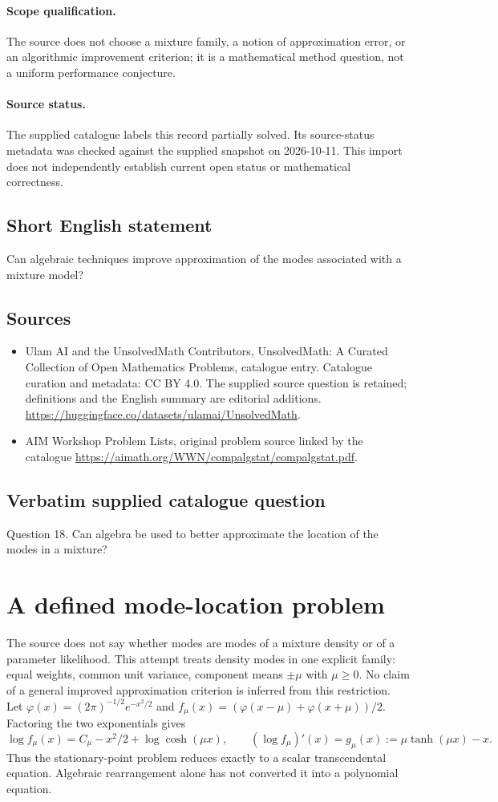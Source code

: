 \documentclass[11pt]{article}
\begin{document}
\paragraph{Scope qualification.}
The source does not choose a mixture family, a notion of approximation error, or an algorithmic improvement criterion; it is a mathematical method question, not a uniform performance conjecture.
\paragraph{Source status.}
The supplied catalogue labels this record partially solved. Its source-status metadata was checked against the supplied snapshot on 2026-10-11. This import does not independently establish current open status or mathematical correctness.
\subsection{Short English statement}
Can algebraic techniques improve approximation of the modes associated with a mixture model?
\subsection{Sources}
\begin{itemize}
\item[S1] Ulam AI and the UnsolvedMath Contributors, UnsolvedMath: A Curated Collection of Open Mathematics Problems, catalogue entry. Catalogue curation and metadata: CC BY 4.0. The supplied source question is retained; definitions and the English summary are editorial additions.
\url{https://huggingface.co/datasets/ulamai/UnsolvedMath}.
\item[S2] AIM Workshop Problem Lists, original problem source linked by the catalogue
\url{https://aimath.org/WWN/compalgstat/compalgstat.pdf}.
\end{itemize}
\subsection{Verbatim supplied catalogue question}
Question 18. Can algebra be used to better approximate the location of the modes in a mixture?

\section{A defined mode-location problem}
The source does not say whether modes are modes of a mixture density or
of a parameter likelihood. This attempt treats density modes in one
explicit family: equal weights, common unit variance, component means
$\pm\mu$ with $\mu\ge0$. No claim of a general improved approximation
criterion is inferred from this restriction.
Let $\varphi(x)=(2\pi)^{-1/2}e^{-x^2/2}$ and
$f_\mu(x)=(\varphi(x-\mu)+\varphi(x+\mu))/2$.
Factoring the two exponentials gives
\[
 \log f_\mu(x)=C_\mu-x^2/2+\log\cosh(\mu x),\qquad
 (\log f_\mu)'(x)=g_\mu(x):=\mu\tanh(\mu x)-x.
\]
Thus the stationary-point problem reduces exactly to a scalar
transcendental equation. Algebraic rearrangement alone has not converted
it into a polynomial equation.
\end{document}
